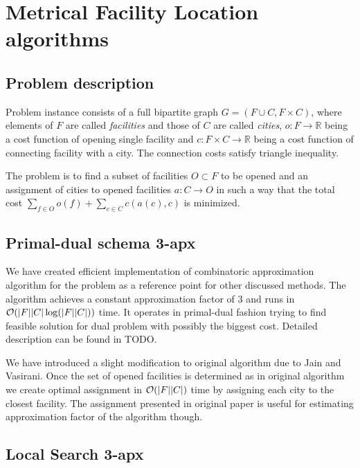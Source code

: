 \chapter{Metrical Facility Location algorithms}

\section{Problem description}

Problem instance consists of a full bipartite graph $G = (F \cup C, F \times
C)$, where elements of $F$ are called \emph{facilities} and those of $C$ are
called \emph{cities}, $o : F \to \mathbb{R}$ being a cost function of opening
single facility and $c : F \times C \to \mathbb{R}$ being a cost function of
connecting facility with a city. The connection costs satisfy triangle
inequality.

The problem is to find a subset of facilities $O \subset F$ to be opened and an
assignment of cities to opened facilities $a : C \to O$ in such a way that the
total cost $\sum_{f \in O} o(f) + \sum_{c \in C} c(a(c), c)$ is minimized.

\section{Primal-dual schema 3-apx}
We have created efficient implementation of combinatoric approximation
algorithm for the problem as a reference point for other discussed methods. The
algorithm achieves a constant approximation factor of 3 and runs in $\mathcal{O}(|F||C|
\log(|F||C|))$ time. It operates in primal-dual fashion trying to find feasible
solution for dual problem with possibly the biggest cost. Detailed description
can be found in TODO. %

We have introduced a slight modification to original algorithm due to Jain and
Vasirani. Once the set of opened facilities is determined as in original
algorithm we create optimal assignment in $\mathcal{O}(|F||C|)$ time by assigning each
city to the closest facility. The assignment presented in original paper is
useful for estimating approximation factor of the algorithm though.

\section{Local Search 3-apx}

